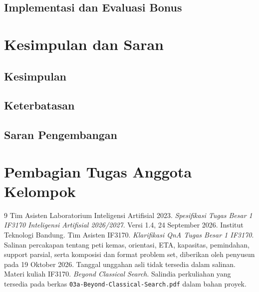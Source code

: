 \documentclass[11pt,a4paper]{article}
\begin{document}
\subsection{Implementasi dan Evaluasi Bonus}
\par\pagebreak[0]


\section{Kesimpulan dan Saran}
\par\pagebreak[0]

\subsection{Kesimpulan}
\par\pagebreak[0]

\subsection{Keterbatasan}
\par\pagebreak[0]

\subsection{Saran Pengembangan}
\par\pagebreak[0]


\section{Pembagian Tugas Anggota Kelompok}
\par\pagebreak[0]


\begin{thebibliography}{9}
 Tim Asisten Laboratorium Inteligensi Artifisial 2023.
\textit{Spesifikasi Tugas Besar 1 IF3170 Inteligensi Artifisial 2026/2027}.
Versi 1.4, 24 September 2026. Institut Teknologi Bandung.
 Tim Asisten IF3170.
\textit{Klarifikasi QnA Tugas Besar 1 IF3170}.
Salinan percakapan tentang peti kemas, orientasi, ETA, kapasitas, pemindahan,
support parsial, serta komposisi dan format problem set, diberikan oleh
penyusun pada 19 Oktober 2026. Tanggal unggahan asli tidak tersedia dalam salinan.
 Materi kuliah IF3170.
\textit{Beyond Classical Search}. Salindia perkuliahan yang tersedia pada
berkas \texttt{03a-Beyond-Classical-Search.pdf} dalam bahan proyek.
\end{thebibliography}
\end{document}
